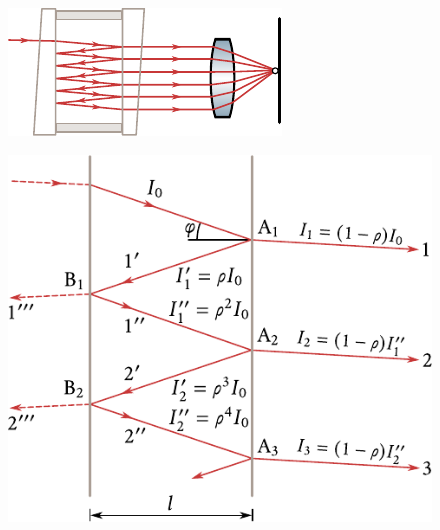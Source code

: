 \begin{figure}[!htb]
	\begin{minipage}[t]{0.38\linewidth}
		\begin{center}
			\includegraphics[scale=1]{figures/ch_17/fig_17_20.pdf}
			\caption[]{}
			\label{fig:17_20}
		\end{center}
	\end{minipage}
	\hfill{ }%
	\begin{minipage}[t]{0.62\linewidth}
		\begin{center}
			\includegraphics[scale=0.85]{figures/ch_17/fig_17_21.pdf}
            \caption[]{}
			\label{fig:17_21}
		\end{center}
	\end{minipage}
\vspace{-0.4cm}
\end{figure}

